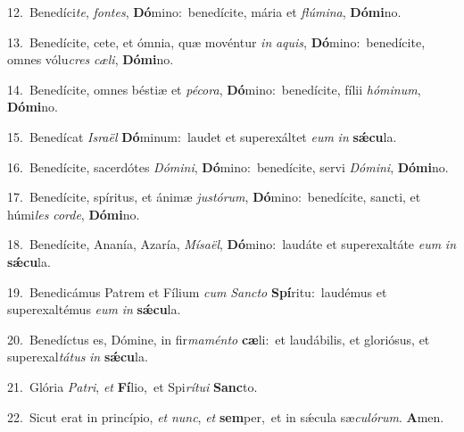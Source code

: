 {\numbfont\textcolor{\numbcolor}{12.}}~Benedíci\-\textit{te}\-, \textit{fon}\-\textit{tes}, \textbf{Dó}\-mino:~\star benedícite, mária et \textit{flú}\-\textit{mi}\textit{na}, \textbf{Dó}\-\textbf{mi}no.\par
{\numbfont\textcolor{\numbcolor}{13.}}~Benedícite, cete, et ómnia, quæ movéntur \textit{in} \textit{a}\-\textit{quis}, \textbf{Dó}\-mino:~\star benedícite, omnes vólu\textit{cres} \textit{cæ}\-\textit{li}, \textbf{Dó}\-\textbf{mi}no.\par
{\numbfont\textcolor{\numbcolor}{14.}}~Benedícite, omnes béstiæ et \textit{pé}\-\textit{co}\textit{ra}, \textbf{Dó}\-mino:~\star benedícite, fílii \textit{hó}\-\textit{mi}\textit{num}, \textbf{Dó}\-\textbf{mi}no.\par
{\numbfont\textcolor{\numbcolor}{15.}}~Benedícat \textit{Is}\-\textit{ra}\textit{ël} \textbf{Dó}\-minum:~\star laudet et superexáltet \textit{e}\-\textit{um} \textit{in} \textbf{sǽ}\-\textbf{cu}la.\par
{\numbfont\textcolor{\numbcolor}{16.}}~Benedícite, sacerdótes \textit{Dó}\-\textit{mi}\textit{ni}, \textbf{Dó}\-mino:~\star benedícite, servi \textit{Dó}\-\textit{mi}\textit{ni}, \textbf{Dó}\-\textbf{mi}no.\par
{\numbfont\textcolor{\numbcolor}{17.}}~Benedícite, spíritus, et ánimæ \textit{jus}\-\textit{tó}\textit{rum}, \textbf{Dó}\-mino:~\star benedícite, sancti, et húmi\textit{les} \textit{cor}\-\textit{de}, \textbf{Dó}\-\textbf{mi}no.\par
{\numbfont\textcolor{\numbcolor}{18.}}~Benedícite, Ananía, Azaría, \textit{Mí}\-\textit{sa}\textit{ël}, \textbf{Dó}\-mino:~\star laudáte et superexaltáte \textit{e}\-\textit{um} \textit{in} \textbf{sǽ}\-\textbf{cu}la.\par
{\numbfont\textcolor{\numbcolor}{19.}}~Benedicámus Patrem et Fílium \textit{cum} \textit{Sanc}\-\textit{to} \textbf{Spí}\-ritu:~\star laudémus et superexaltémus \textit{e}\-\textit{um} \textit{in} \textbf{sǽ}\-\textbf{cu}la.\par
{\numbfont\textcolor{\numbcolor}{20.}}~Benedíctus es, Dómine, in fir\-\textit{ma}\-\textit{mén}\textit{to} \textbf{cæ}\-li:~\star et laudábilis, et gloriósus, et superexal\-\textit{tá}\-\textit{tus} \textit{in} \textbf{sǽ}\-\textbf{cu}la.\par
{\numbfont\textcolor{\numbcolor}{21.}}~Glória \textit{Pa}\-\textit{tri}, \textit{et} \textbf{Fí}\-lio,~\star et Spi\-\textit{rí}\-\textit{tu}\textit{i} \textbf{Sanc}\-to.\par
{\numbfont\textcolor{\numbcolor}{22.}}~Sicut erat in princípio, \textit{et} \textit{nunc}\-, \textit{et} \textbf{sem}\-per,~\star et in sǽcula sæ\-\textit{cu}\-\textit{ló}\textit{rum}. \textbf{A}\-men.\par
